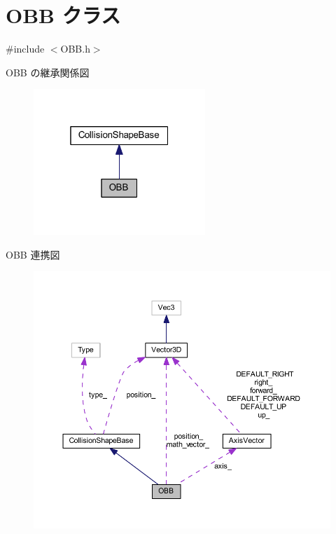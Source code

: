 \hypertarget{class_o_b_b}{}\section{O\+BB クラス}
\label{class_o_b_b}


{\ttfamily \#include $<$O\+B\+B.\+h$>$}



O\+BB の継承関係図\nopagebreak
\begin{figure}[H]
\begin{center}
\leavevmode
\includegraphics[width=184pt]{class_o_b_b__inherit__graph}
\end{center}
\end{figure}


O\+BB 連携図\nopagebreak
\begin{figure}[H]
\begin{center}
\leavevmode
\includegraphics[width=350pt]{class_o_b_b__coll__graph}
\end{center}
\end{figure}
